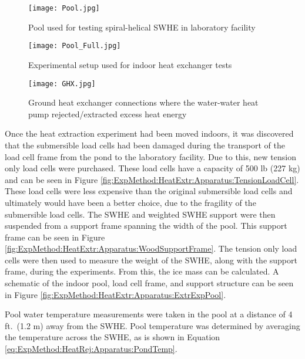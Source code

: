 	\begin{figure}
		\centering
		\texttt{[image: Pool.jpg]}
		\caption[Uninsulated indoor test pool]{Pool used for testing spiral-helical SWHE in laboratory facility}
		\label{fig:ExpMethod:HeatExtr:Apparatus:EmptyPool}
	\end{figure}

	\begin{figure}
		\centering
		\texttt{[image: Pool\_Full.jpg]}
		\caption[Indoor test pool during experiment]{Experimental setup used for indoor heat exchanger tests}
		\label{fig:ExpMethod:HeatExtr:Apparatus:FullPool}
	\end{figure}

	\begin{figure}
		\centering
		\texttt{[image: GHX.jpg]}
		\caption[Ground heat exchanger connections]{Ground heat exchanger connections where the water-water heat pump rejected/extracted excess heat energy}
		\label{fig:ExpMethod:HeatExtr:Apparatus:GHX}
	\end{figure}

Once the heat extraction experiment had been moved indoors, it was discovered that the submersible load cells had been damaged during the transport of the load cell frame from the pond to the laboratory facility. Due to this, new tension only load cells were purchased. These load cells have a capacity of 500 lb (227 kg) and can be seen in Figure \ref{fig:ExpMethod:HeatExtr:Apparatus:TensionLoadCell}. These load cells were less expensive than the original submersible load cells and ultimately would have been a better choice, due to the fragility of the submersible load cells. The SWHE and weighted SWHE support were then suspended from a support frame spanning the width of the pool. This support frame can be seen in Figure \ref{fig:ExpMethod:HeatExtr:Apparatus:WoodSupportFrame}. The tension only load cells were then used to measure the weight of the SWHE, along with the support frame, during the experiments. From this, the ice mass can be calculated. A schematic of the indoor pool, load cell frame, and support structure can be seen in Figure \ref{fig:ExpMethod:HeatExtr:Apparatus:ExtrExpPool}.

Pool water temperature measurements were taken in the pool at a distance of 4 ft.\ (1.2 m) away from the SWHE. Pool temperature was determined by averaging the temperature across the SWHE, as is shown in Equation \ref{eq:ExpMethod:HeatRej:Apparatus:PondTemp}.

